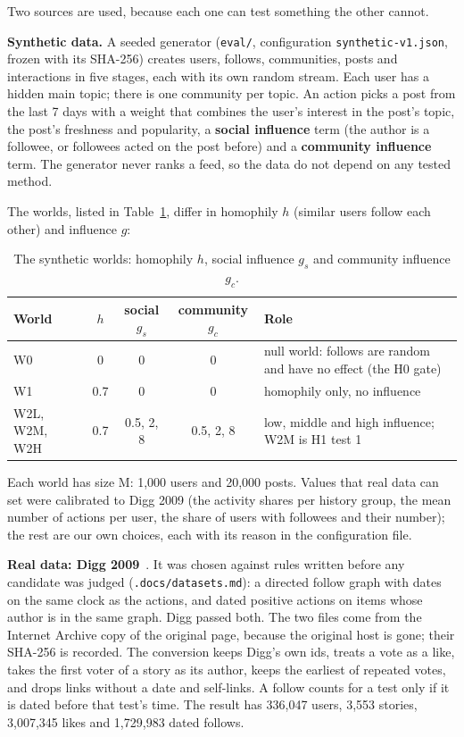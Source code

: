 Two sources are used, because each one can test something the other cannot.

\textbf{Synthetic data.} A seeded generator (\texttt{eval/}, configuration \texttt{synthetic-v1\allowbreak.json}, frozen with its SHA-256) creates users, follows, communities, posts and interactions in five stages, each with its own random stream. Each user has a hidden main topic; there is one community per topic. An action picks a post from the last 7 days with a weight that combines the user's interest in the post's topic, the post's freshness and popularity, a \textbf{social influence} term (the author is a followee, or followees acted on the post before) and a \textbf{community influence} term. The generator never ranks a feed, so the data do not depend on any tested method.

The worlds, listed in Table~\ref{tab:method-worlds}, differ in homophily $h$ (similar users follow each other) and influence $g$:

\begin{table}[htbp]
  \centering
  \caption{The synthetic worlds: homophily $h$, social influence $g_s$ and community influence $g_c$.}
  \label{tab:method-worlds}
  \small
  \renewcommand{\arraystretch}{1.15}
  \begin{tabularx}{\textwidth}{@{}l c c c >{\raggedright\arraybackslash}X@{}}
    \toprule
    World & $h$ & social $g_s$ & community $g_c$ & Role \\
    \midrule
    W0 & 0 & 0 & 0 & null world: follows are random and have no effect (the H0 gate) \\
    W1 & 0.7 & 0 & 0 & homophily only, no influence \\
    W2L, W2M, W2H & 0.7 & 0.5, 2, 8 & 0.5, 2, 8 & low, middle and high influence; W2M is H1 test 1 \\
    \bottomrule
  \end{tabularx}
\end{table}

Each world has size M: 1,000 users and 20,000 posts. Values that real data can set were calibrated to Digg 2009 (the activity shares per history group, the mean number of actions per user, the share of users with followees and their number); the rest are our own choices, each with its reason in the configuration file.

\textbf{Real data: Digg 2009}~. It was chosen against rules written before any candidate was judged (\texttt{.docs/datasets.md}): a directed follow graph with dates on the same clock as the actions, and dated positive actions on items whose author is in the same graph. Digg passed both. The two files come from the Internet Archive copy of the original page, because the original host is gone; their SHA-256 is recorded. The conversion keeps Digg's own ids, treats a vote as a like, takes the first voter of a story as its author, keeps the earliest of repeated votes, and drops links without a date and self-links. A follow counts for a test only if it is dated before that test's time. The result has 336,047 users, 3,553 stories, 3,007,345 likes and 1,729,983 dated follows.

